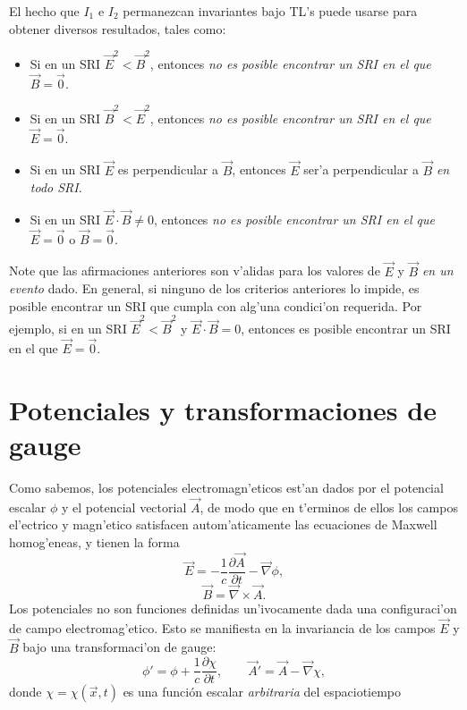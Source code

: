El hecho que $I_1$ e $I_2$ permanezcan invariantes bajo TL's puede usarse para
obtener diversos resultados, tales como:
\begin{itemize}
\item Si en un SRI $\vec{E}^2<\vec{B}^2$, entonces \textit{no es posible
encontrar un SRI en el que} $\vec{B}=\vec{0}$.
\item Si en un SRI $\vec{B}^2<\vec{E}^2$, entonces \textit{no es posible
encontrar un SRI en el que} $\vec{E}=\vec{0}$.
\item Si en un SRI $\vec{E}$ es perpendicular a $\vec{B}$, entonces $\vec{E}$
ser'a perpendicular a $\vec{B}$ \textit{en todo SRI}.
\item Si en un SRI $\vec{E}\cdot\vec{B}\neq 0$, entonces \textit{no es posible
encontrar un SRI en el que} $\vec{E}=\vec{0}$ o $\vec{B}=\vec{0}$.
\end{itemize}
Note que las afirmaciones anteriores son v'alidas para los valores de $\vec{E}$
y $\vec{B}$ \textit{en un evento} dado. En general, si ninguno de los criterios
anteriores lo impide, es posible encontrar un SRI que cumpla con alg'una
condici'on requerida. Por ejemplo, si en un SRI $\vec{E}^2<\vec{B}^2$ y
$\vec{E}\cdot\vec{B}=0$, entonces es posible encontrar un SRI en el que
$\vec{E}=\vec{0}$.




\section{Potenciales y transformaciones de gauge}
Como sabemos, los potenciales electromagn'eticos est'an dados por el potencial escalar $\phi$ y el potencial vectorial $\vec{A}$, de modo que en t'erminos de ellos los campos el'ectrico y magn'etico satisfacen autom'aticamente las ecuaciones de Maxwell homog'eneas, y tienen la forma
\begin{equation}\label{defphi}
\vec{E} =  - \frac{1}{c} \frac{\partial \vec{A}}{\partial t} - \vec{\nabla}\phi ,
\end{equation}
\begin{equation}\label{BrotA}
\vec{B}=\vec{\nabla}\times \vec{A}.
\end{equation}
Los potenciales no son funciones definidas un'ivocamente dada una configuraci'on de campo electromag'etico. Esto se manifiesta en la invariancia de los campos $\vec{E}$ y $\vec{B}$ bajo una transformaci'on de gauge:
\begin{equation}
\phi' =\phi +\frac{1}{c}\frac{\partial \chi}{\partial t}, \qquad
{\vec{A}}' = \vec{A} - \vec{\nabla}{\chi},
\end{equation}
donde $\chi=\chi(\vec{x},t)$ es una funci\'on escalar \textit{arbitraria} del espaciotiempo

